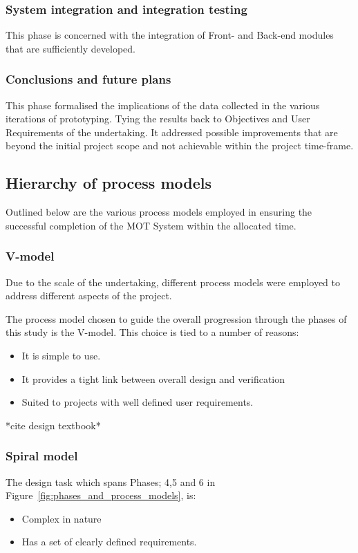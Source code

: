 \subsubsection{System integration and integration testing}
This phase is concerned with the integration of Front- and Back-end modules that
are sufficiently developed. 

\subsubsection{Conclusions and future plans}
This phase formalised the implications of the data collected in the various
iterations of prototyping. Tying the results back to Objectives and User
Requirements of the undertaking.
It addressed possible improvements that are beyond the initial project scope
and not achievable within the project time-frame.



\subsection{Hierarchy of process models}
Outlined below are the various process models employed in ensuring the
successful completion of the MOT System within the allocated time.

\subsubsection{V-model}
Due to the scale of the undertaking, different process models were employed to
address different aspects of the project.

The process model chosen to guide the overall progression through the phases of
this study is the V-model. This choice is tied to a number of reasons: 
\begin{itemize}
    \item It is simple to use.
    \item It provides a tight link between overall design and verification 
    \item Suited to projects with well defined user requirements.
\end{itemize}

*cite design textbook*

\subsubsection{Spiral model}
The design task which spans Phases; 4,5 and 6 in Figure~\ref{fig:phases_and_process_models}, is: 
\begin{itemize}
    \item Complex in nature
    \item Has a set of clearly defined requirements. 
\end{itemize}





